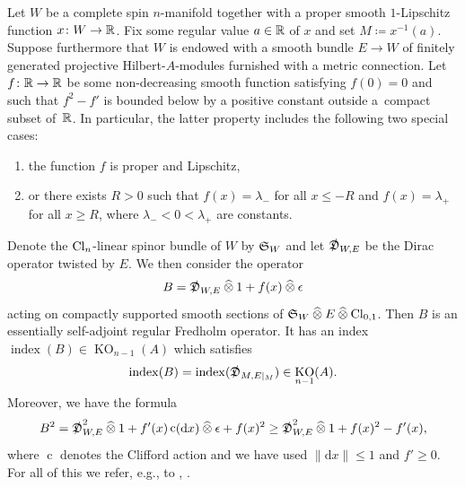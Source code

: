 \documentclass[11pt]{article}
\DeclareMathOperator{\KO}{KO}
\DeclareMathOperator{\ind}{index}
\DeclareMathOperator{\clm}{c}
\numberwithin{equation}{section}
\begin{document}
Let \(W\) be a complete spin \(n\)-manifold together with a proper smooth \(1\)-Lipschitz function \(x \colon W \to \mathbb{R}\).
Fix some regular value \(a \in \mathbb{R}\) of \(x\) and set \(M \coloneqq x^{-1}(a)\).
Suppose furthermore that \(W\) is endowed with a smooth bundle \(E \to W\) of finitely generated projective Hilbert-\(A\)-modules furnished with a metric connection.
Let \(f \colon \mathbb{R} \to \mathbb{R}\) be some non-decreasing smooth function satisfying \(f(0) = 0\) and such that \(f^2 - f'\) is bounded below by a positive constant outside a~compact subset of~\(\mathbb{R}\).
In particular, the latter property includes the following two special cases:
\begin{enumerate}\itemsep=0pt
 \item[(i)] the function \(f\) is proper and Lipschitz,
 \item[(ii)] or there exists \(R > 0\) such that \(f(x) = \lambda_-\) for all \(x \leq -R\) and \(f(x) = \lambda_+\) for all \(x \geq R\), where \(\lambda_- < 0 < \lambda_+\) are constants.
\end{enumerate}
Denote the \(\mathrm{Cl}_n\)-linear spinor bundle of \(W\) by \(\mathfrak{S}_W\) and let \(\slashed{\mathfrak{D}}_{W,E}\) be the Dirac operator twisted by \(E\).
We then consider the operator
\[
 B = \slashed{\mathfrak{D}}_{W, E} \mathbin{\widehat{\otimes}} 1 + f(x) \mathbin{\widehat{\otimes}} \epsilon
\]
acting on compactly supported smooth sections of \(\mathfrak{S}_W \mathbin{\widehat{\otimes}} E \mathbin{\widehat{\otimes}} \mathrm{Cl}_{0,1}\).
Then \(B\) is an essentially self-adjoint regular Fredholm operator.
It has an index \(\ind(B) \in \KO_{n-1}(A)\) which satisfies
\[
 \ind(B) = \ind(\Dirac_{M, E|_M}) \in \KO_{n-1}(A).
\]
Moreover, we have the formula
\begin{equation}
B^2 = \Dirac^2_{W,E} \tensgr 1 + f'(x) \clm(\D x) \tensgr \epsilon + f(x)^2 \geq \Dirac^2_{W,E} \tensgr 1 + f(x)^2 - f'(x),
\label{eq:callias-estimate}
\end{equation}
where \(\clm\) denotes the Clifford action and we have used \(\|\mathrm{d} x\| \leq 1\) and \(f' \geq 0\).
For all of this we refer, e.g., to \cite[Section~6]{Cecchini:LongNeck}, \cite[Appendix~A]{Zeidler:band-width-estimates}.
\end{document}
